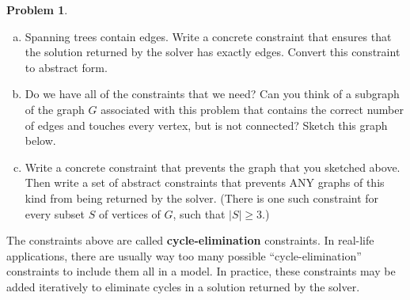 \documentclass[11pt]{article}
\theoremstyle{definition}
\newtheorem{problem}{Problem}
\newcommand{\answerbox}[3]{%
  \fbox{%
    \begin{minipage}[#1]{#2}
      \hfill\vspace{#3}
    \end{minipage}
  }
}
\newcommand{\answerboxone}[2]{%
  \answerbox{#1}{6.0in}{#2} 
}
\newcommand{\catbox}{\answerbox{c}{.5in}{.7cm}}
\newcommand{\letterbox}{\answerbox{c}{.7cm}{.7cm}}
\begin{document}
\begin{problem}
\begin{enumerate}[(a)]
\item Spanning trees contain \catbox edges.  Write a concrete constraint that ensures that the solution returned by the solver has exactly \letterbox edges.  Convert this constraint to abstract form.

\answerboxone{c}{8cm}

\newpage
\item Do we have all of the constraints that we need?  Can you think of a subgraph of the graph $G$ associated with this problem that contains the correct number of edges and touches every vertex, but is not connected?  Sketch this graph below.

\answerboxone{c}{6cm}

\item Write a concrete constraint that prevents the graph that you sketched above.  Then write a set of abstract constraints that prevents ANY graphs of this kind from being returned by the solver.  (There is one such constraint for every subset $S$ of vertices of $G$, such that $|S| \geq 3$.)

\answerboxone{c}{8cm}



\end{enumerate}

\end{problem}

\begin{tcolorbox}
The constraints above are called \textbf{cycle-elimination} constraints.  In real-life applications, there are usually way too many possible ``cycle-elimination'' constraints to include them all in a model.  In practice, these constraints may be added iteratively to eliminate cycles in a solution returned by the solver. 
\end{tcolorbox}
\end{document}
